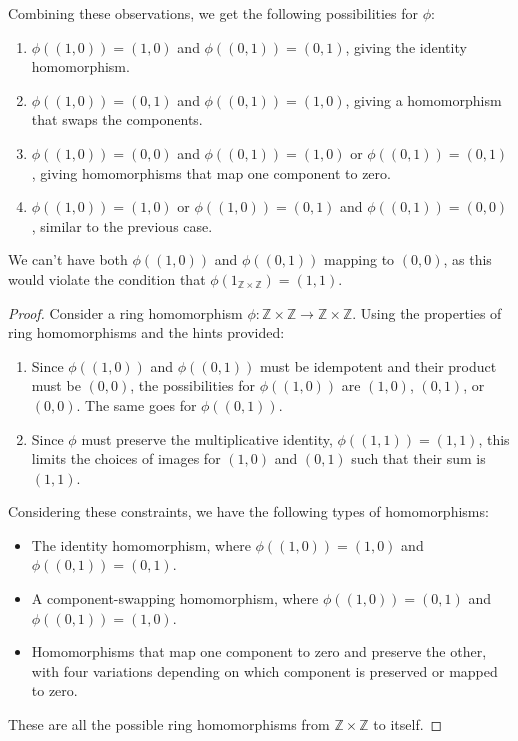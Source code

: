 \documentclass[12pt]{amsart}
\theoremstyle{definition}
\numberwithin{equation}{section}
\theoremstyle{plain}
\begin{document}
\begin{exercise}{1}
Combining these observations, we get the following possibilities for \(\phi\):

\begin{enumerate}
    \item \(\phi((1, 0)) = (1, 0)\) and \(\phi((0, 1)) = (0, 1)\), giving the identity homomorphism.
    \item \(\phi((1, 0)) = (0, 1)\) and \(\phi((0, 1)) = (1, 0)\), giving a homomorphism that swaps the components.
    \item \(\phi((1, 0)) = (0, 0)\) and \(\phi((0, 1)) = (1, 0)\) or \(\phi((0, 1)) = (0, 1)\), giving homomorphisms that map one component to zero.
    \item \(\phi((1, 0)) = (1, 0)\) or \(\phi((1, 0)) = (0, 1)\) and \(\phi((0, 1)) = (0, 0)\), similar to the previous case.
\end{enumerate}

We can't have both \(\phi((1, 0))\) and \(\phi((0, 1))\) mapping to \((0, 0)\), as this would violate the condition that 
\(\phi(1_{\mathbb{Z} \times \mathbb{Z}}) = (1, 1)\).

\begin{proof}
Consider a ring homomorphism \(\phi : \mathbb{Z} \times \mathbb{Z} \rightarrow \mathbb{Z} \times \mathbb{Z}\). Using the properties of ring homomorphisms and the hints provided:

\begin{enumerate}
    \item Since \(\phi((1, 0))\) and \(\phi((0, 1))\) must be idempotent and their product must be \((0, 0)\), the possibilities for \(\phi((1, 0))\) are \((1, 0)\), \((0, 1)\), or \((0, 0)\). The same goes for \(\phi((0, 1))\).
    
    \item Since \(\phi\) must preserve the multiplicative identity, \(\phi((1, 1)) = (1, 1)\), this limits the choices of images for \((1, 0)\) and \((0, 1)\) such that their sum is \((1, 1)\).
\end{enumerate}

Considering these constraints, we have the following types of homomorphisms:

\begin{itemize}
    \item The identity homomorphism, where \(\phi((1, 0)) = (1, 0)\) and \(\phi((0, 1)) = (0, 1)\).
    \item A component-swapping homomorphism, where \(\phi((1, 0)) = (0, 1)\) and \(\phi((0, 1)) = (1, 0)\).
    \item Homomorphisms that map one component to zero and preserve the other, with four variations depending on which component is preserved or mapped to zero.
\end{itemize}

These are all the possible ring homomorphisms from \(\mathbb{Z} \times \mathbb{Z}\) to itself.
\end{proof}
\end{exercise}
\vspace*{20pt}
\end{document}
